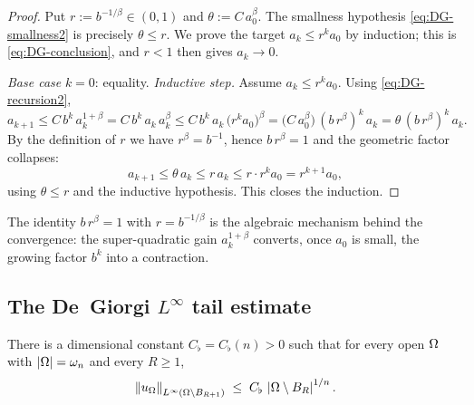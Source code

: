 \begin{proof}
Put $r:=b^{-1/\beta}\in(0,1)$ and $\theta:=C\,a_0^{\beta}$. The smallness
hypothesis \eqref{eq:DG-smallness2} is precisely $\theta\le r$. We prove
the target $a_k\le r^{k}a_0$ by induction; this is
\eqref{eq:DG-conclusion}, and $r<1$ then gives $a_k\to0$.

\emph{Base case} $k=0$: equality. \emph{Inductive step.} Assume
$a_k\le r^{k}a_0$. Using \eqref{eq:DG-recursion2},
\[
   a_{k+1}\le C\,b^{k}\,a_k^{1+\beta}
          =C\,b^{k}\,a_k\,a_k^{\beta}
          \le C\,b^{k}\,a_k\,\bigl(r^{k}a_0\bigr)^{\beta}
          =\bigl(C\,a_0^{\beta}\bigr)\,(b\,r^{\beta})^{k}\,a_k
          =\theta\,(b\,r^{\beta})^{k}\,a_k .
\]
By the definition of $r$ we have $r^{\beta}=b^{-1}$, hence $b\,r^{\beta}=1$
and the geometric factor collapses:
\[
   a_{k+1}\le\theta\,a_k\le r\,a_k\le r\cdot r^{k}a_0=r^{k+1}a_0,
\]
using $\theta\le r$ and the inductive hypothesis. This closes the
induction.
\end{proof}

\begin{remark}
The identity $b\,r^{\beta}=1$ with $r=b^{-1/\beta}$ is the algebraic
mechanism behind the convergence: the super-quadratic gain
$a_k^{1+\beta}$ converts, once $a_0$ is small, the growing factor $b^k$
into a contraction.
\end{remark}

\subsection{The De~Giorgi \texorpdfstring{$L^\infty$}{L-infinity} tail
estimate}\label{ssec:Linfty}

\begin{lemma}\label{lem:Linfty}
There is a dimensional constant $C_\flat=C_\flat(n)>0$ such that for
every open $\Omega$ with $\left|\Omega\right|=\omega_n$ and every $R\ge1$,
\begin{equation}\label{eq:Linfty}
   \left\|u_\Omega\right\|_{L^\infty(\Omega\setminus B_{R+1})}
   \;\le\;C_\flat\,\left|\Omega\setminus B_R\right|^{1/n}.
\end{equation}
\end{lemma}

